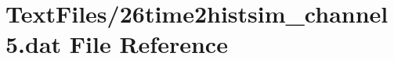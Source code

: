 \hypertarget{26time2histsim__channel5_8dat}{}\section{Text\+Files/26time2histsim\+\_\+channel5.dat File Reference}
\label{26time2histsim__channel5_8dat}
